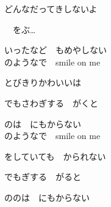 {どんなだってきしないよ

　をぶ…

いったなど　もめやしない
\\

のようなで　smile on me

とびきりかわいいは

でもさわぎする　がくと

のは　にもからない
\\

のようなで　smile on me

をしていても　かられない

でもぎする　がると

ののは　にもからない

}